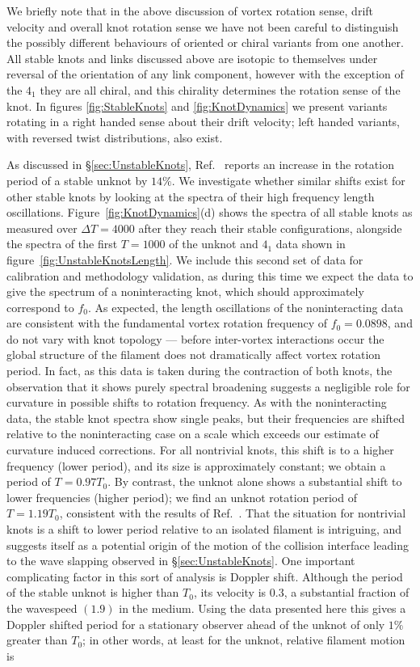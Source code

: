 We briefly note that in the above discussion of vortex rotation sense, drift velocity and overall knot rotation sense we have not been careful to distinguish the possibly different behaviours of oriented or chiral variants from one another. All stable knots and links discussed above are isotopic to themselves under reversal of the orientation of any link component, however with the exception of the $4_1$ they are all chiral, and this chirality determines the rotation sense of the knot. In figures \ref{fig:StableKnots} and \ref{fig:KnotDynamics} we present variants rotating in a right handed sense about their drift velocity; left handed variants, with reversed twist distributions, also exist.

As discussed in \S \ref{sec:UnstableKnots}, Ref.~\citep{Maucher2018} reports an increase in the rotation period of a stable unknot by $14\%$. We investigate whether similar shifts exist for other stable knots by looking at the spectra of their high frequency length oscillations. Figure~\ref{fig:KnotDynamics}(d) shows the spectra of all stable knots as measured over $\Delta T = 4000$ after they reach their stable configurations, alongside the spectra of the first $T=1000$ of the unknot and $4_1$ data shown in figure~\ref{fig:UnstableKnotsLength}. We include this second set of data for calibration and methodology validation, as during this time we expect the data to give the spectrum of a noninteracting knot, which should approximately correspond to $f_0$. As expected, the length oscillations of the noninteracting data are consistent with the fundamental vortex rotation frequency of $f_0=0.0898$, and do not vary with knot topology --- before inter-vortex interactions occur the global structure of the filament does not dramatically affect vortex rotation period. In fact, as this data is taken during the contraction of both knots, the observation that it shows purely spectral broadening suggests a negligible role for curvature in possible shifts to rotation frequency. As with the noninteracting data, the stable knot spectra show single peaks, but their frequencies are shifted relative to the noninteracting case on a scale which exceeds our estimate of curvature induced corrections. For all nontrivial knots, this shift is to a higher frequency (lower period), and its size is approximately constant; we obtain a period of $T=0.97T_0$. By contrast, the unknot alone shows a substantial shift to lower frequencies (higher period); we find an unknot rotation period of $T=1.19T_0$, consistent with the results of Ref.~\citep{Maucher2018}. That the situation for nontrivial knots is a shift to lower period relative to an isolated filament is intriguing, and suggests itself as a potential origin of the motion of the collision interface leading to the wave slapping observed in \S \ref{sec:UnstableKnots}. One important complicating factor in this sort of analysis is Doppler shift. Although the period of the stable unknot is higher than $T_0$, its velocity is $0.3$, a substantial fraction of the wavespeed $(1.9)$ in the medium. Using the data presented here this gives a Doppler shifted period for a stationary observer ahead of the unknot of only $1\%$ greater than $T_0$; in other words, at least for the unknot, relative filament motion is 